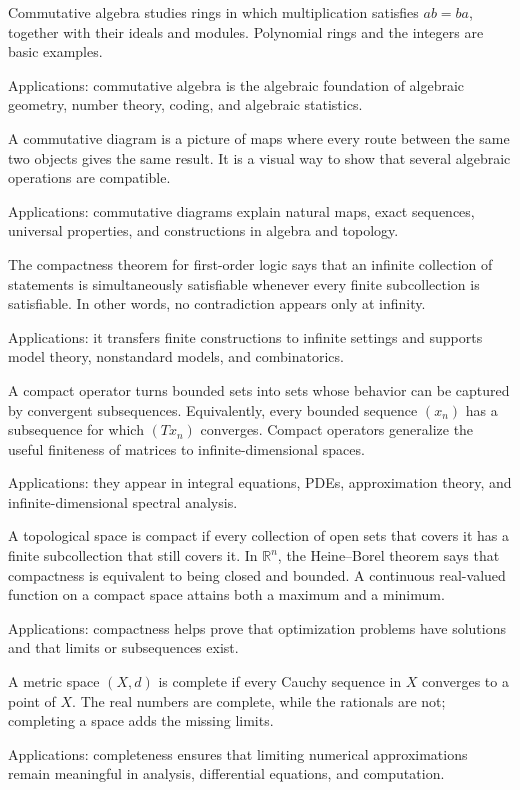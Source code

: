 Commutative algebra studies rings in which multiplication satisfies $ab=ba$, together with their ideals and modules. Polynomial rings and the integers are basic examples. \par\noindent Applications: commutative algebra is the algebraic foundation of algebraic geometry, number theory, coding, and algebraic statistics.

A commutative diagram is a picture of maps where every route between the same two objects gives the same result. It is a visual way to show that several algebraic operations are compatible. \par\noindent Applications: commutative diagrams explain natural maps, exact sequences, universal properties, and constructions in algebra and topology.

The compactness theorem for first-order logic says that an infinite collection of statements is simultaneously satisfiable whenever every finite subcollection is satisfiable. In other words, no contradiction appears only at infinity. \par\noindent Applications: it transfers finite constructions to infinite settings and supports model theory, nonstandard models, and combinatorics.

A compact operator turns bounded sets into sets whose behavior can be captured by convergent subsequences. Equivalently, every bounded sequence $(x_n)$ has a subsequence for which $(Tx_n)$ converges. Compact operators generalize the useful finiteness of matrices to infinite-dimensional spaces. \par\noindent Applications: they appear in integral equations, PDEs, approximation theory, and infinite-dimensional spectral analysis.

A topological space is compact if every collection of open sets that covers it has a finite subcollection that still covers it. In $\mathbb{R}^n$, the Heine--Borel theorem says that compactness is equivalent to being closed and bounded. A continuous real-valued function on a compact space attains both a maximum and a minimum. \par\noindent Applications: compactness helps prove that optimization problems have solutions and that limits or subsequences exist.

A metric space $(X,d)$ is complete if every Cauchy sequence in $X$ converges to a point of $X$. The real numbers are complete, while the rationals are not; completing a space adds the missing limits. \par\noindent Applications: completeness ensures that limiting numerical approximations remain meaningful in analysis, differential equations, and computation.

